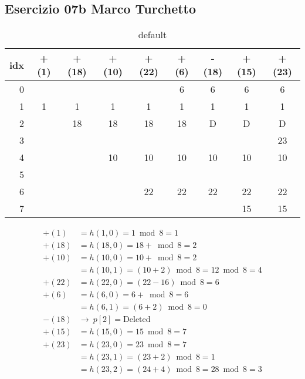 
\subsection[07b MT]{Esercizio 07b Marco Turchetto}

\begin{table}[htdp]
	\caption{default}
	\begin{center}
	\begin{tabular}{r | *{8}{c|}}
		idx & +(1) & +(18) & +(10) & +(22) & +(6) & -(18) & +(15) & +(23) \\ \hline
		0   &      &       &       &       &    6 &     6 &     6 &    6  \\ \cline{2-9}
		1   &    1 &     1 &     1 &     1 &    1 &     1 &     1 &    1  \\ \cline{2-9}
		2   &      &    18 &    18 &    18 &   18 &     D &     D &    D  \\ \cline{2-9}
		3   &      &       &       &       &      &       &       &   23  \\ \cline{2-9}
		4   &      &       &    10 &    10 &   10 &    10 &    10 &   10  \\ \cline{2-9}
		5   &      &       &       &       &      &       &       &       \\ \cline{2-9}
		6   &      &       &       &    22 &   22 &    22 &    22 &   22  \\ \cline{2-9}
		7   &      &       &       &       &      &       &    15 &   15  \\ \cline{2-9}
	\end{tabular}
	\end{center}
	\label{default}
\end{table}

\begin{align*}
	+(1)  &= h(1,0)  = 1 \bmod 8 = 1 \\
	+(18) &= h(18,0) = 18 + \bmod 8 = 2 \\
	+(10) &= h(10,0) = 10 + \bmod 8 = 2 \\
		  &= h(10,1) = (10 + 2) \bmod 8 = 12 \bmod 8 = 4 \\
	+(22) &= h(22,0) = (22 - 16) \bmod 8 = 6 \\
	+(6)  &= h(6,0)  = 6 + \bmod 8 = 6 \\
		  &= h(6,1)  = (6 + 2) \bmod 8 = 0 \\
	-(18) &\rightarrow \ p[2] = \text{Deleted} \\
	+(15) &= h(15,0) = 15 \bmod 8 = 7 \\
	+(23) &= h(23,0) = 23 \bmod 8 = 7 \\
		  &= h(23,1) = (23 + 2) \bmod 8 = 1 \\
		  &= h(23,2) = (24 + 4) \bmod 8= 28 \bmod 8 = 3 \\
\end{align*}



